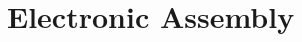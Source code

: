 
\chapter{Electronic Assembly}\label{annex:electronic}
\label{annex:schematic}
\label{annex:assembly}
